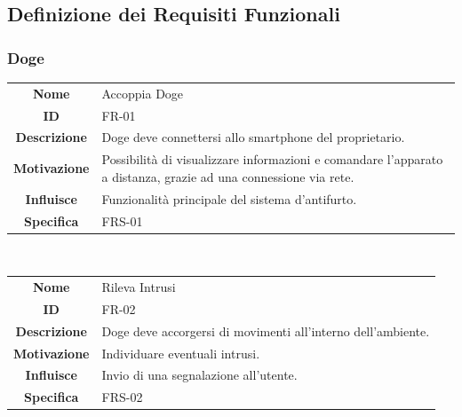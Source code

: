 \documentclass{article}
\begin{document}
    \subsection{Definizione dei Requisiti Funzionali}
    
    \subsubsection{Doge}
    
    \begin{adjustbox}{center}
    \begin{tabular}{|c|p{10cm}|}
    \hline
    \textbf{Nome} & Accoppia Doge \\
    \textbf{ID} & FR-01 \\
    \textbf{Descrizione} & Doge deve connettersi allo smartphone del proprietario. \\
    \textbf{Motivazione} & Possibilità di visualizzare informazioni e comandare l'apparato a distanza, grazie ad una connessione via rete. \\
    \textbf{Influisce} & Funzionalità principale del sistema d'antifurto. \\
    \textbf{Specifica} & FRS-01 \\
    \hline
    \end{tabular}
    \end{adjustbox}
    
    ~
    
    \begin{adjustbox}{center}
    \begin{tabular}{|c|p{10cm}|}
    \hline
    \textbf{Nome} & Rileva Intrusi \\
    \textbf{ID} & FR-02 \\
    \textbf{Descrizione} & Doge deve accorgersi di movimenti all'interno dell'ambiente. \\
    \textbf{Motivazione} & Individuare eventuali intrusi. \\
    \textbf{Influisce} & Invio di una segnalazione all'utente. \\
    \textbf{Specifica} & FRS-02 \\
    \hline
    \end{tabular}
    \end{adjustbox}
    
    ~
    
\end{document}
